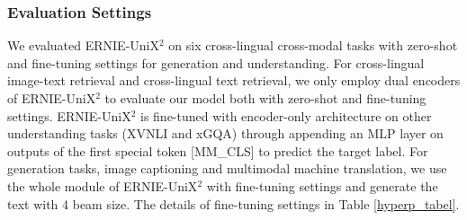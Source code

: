 \documentclass{article}
\begin{document}
\subsubsection{Evaluation Settings}
We evaluated  ERNIE-UniX$^{2}$ on six cross-lingual cross-modal tasks with zero-shot and fine-tuning settings for generation and understanding. For cross-lingual image-text retrieval and cross-lingual text retrieval, we only employ dual encoders of ERNIE-UniX$^{2}$ to evaluate our model both with zero-shot and fine-tuning settings. ERNIE-UniX$^{2}$ is fine-tuned with encoder-only architecture on other understanding tasks (XVNLI and xGQA) through appending an MLP layer on outputs of the first special token [MM\_CLS] to predict the target label. For generation tasks, image captioning and multimodal machine translation, we use the whole module of ERNIE-UniX$^{2}$ with fine-tuning settings and generate the text with 4 beam size. The details of fine-tuning settings in 
Table \ref{hyperp_tabel}.
\end{document}
